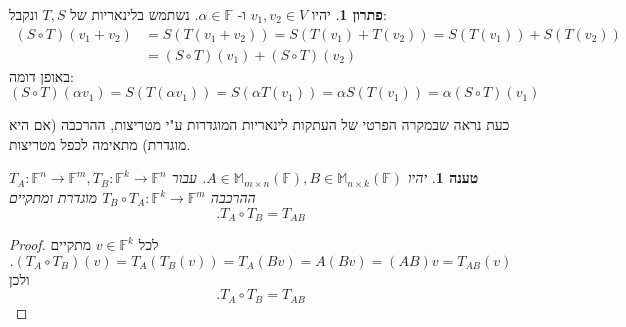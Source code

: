 \documentclass[12pt]{report}
\theoremstyle{plain}
\newtheorem{proposition}[theorem]{טענה}
\theoremstyle{definition}
\newtheorem*{solution}{פתרון}
\newcommand{\F}{\mathbb{F}}
\newcommand{\M}{\mathbb{M}}
\newcommand{\0}{\mathbf{0}}
\begin{document}
\begin{solution}
יהיו
$v_1,v_2\in V$
ו-
$\alpha\in\F$.
נשתמש בלינאריות של 
$T,S$
ונקבל:
$$
\begin{aligned}
(S\circ T)(v_1+v_2)&=S(T(v_1+v_2))=S(T(v_1)+T(v_2))=S(T(v_1))+S(T(v_2)) \\
&=(S\circ T)(v_1)+(S\circ T)(v_2)
\end{aligned}
$$
באופן דומה:
$$
(S\circ T)(\alpha v_1)=S(T(\alpha v_1))=S(\alpha T(v_1))=\alpha S(T(v_1))=\alpha (S\circ T)(v_1)
$$

\end{solution}

כעת נראה שבמקרה הפרטי של העתקות לינאריות המוגדרות ע"י מטריצות, ההרכבה (אם היא מוגדרת) מתאימה לכפל מטריצות.

\begin{proposition}\label{prop:homeo}
יהיו
$A\in\M_{m\times n}(\F),B\in\M_{n\times k}(\F)$.
עבור
$T_A:\F^n\to\F^m,T_B:\F^k\to\F^n$
ההרכבה
$T_B\circ T_A:\F^k\to\F^m$
מוגדרת ומתקיים
$$
.T_A\circ T_B=T_{AB}
$$
\end{proposition}

\begin{proof}
לכל
$v\in\F^k$
מתקיים
$$
.(T_A\circ T_B)(v)=T_A(T_B(v))=T_A(Bv)=A(Bv)=(AB)v=T_{AB}(v)
$$
ולכן
$$
.T_A\circ T_B=T_{AB}
$$
\end{proof}
\end{document}

